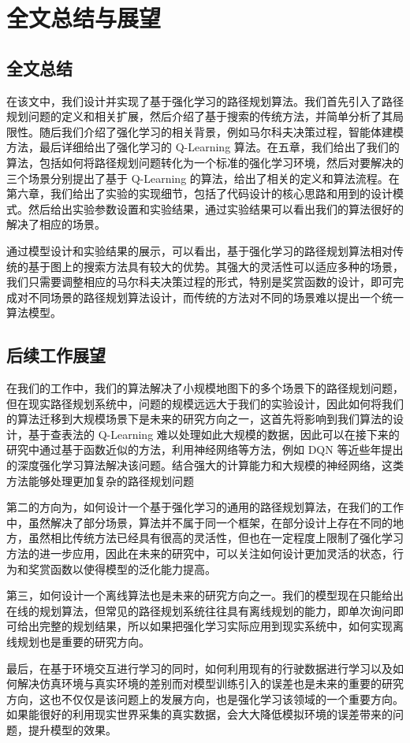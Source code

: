 \documentclass{standalone}
\begin{document}
\chapter{全文总结与展望}
\section{全文总结}
在该文中，我们设计并实现了基于强化学习的路径规划算法。我们首先引入了路径规划问题的定义和相关扩展，然后介绍了基于搜索的传统方法，并简单分析了其局限性。随后我们介绍了强化学习的相关背景，例如马尔科夫决策过程，智能体建模方法，最后详细给出了强化学习的 Q-Learning 算法。在五章，我们给出了我们的算法，包括如何将路径规划问题转化为一个标准的强化学习环境，然后对要解决的三个场景分别提出了基于 Q-Learning 的算法，给出了相关的定义和算法流程。在第六章，我们给出了实验的实现细节，包括了代码设计的核心思路和用到的设计模式。然后给出实验参数设置和实验结果，通过实验结果可以看出我们的算法很好的解决了相应的场景。\par
通过模型设计和实验结果的展示，可以看出，基于强化学习的路径规划算法相对传统的基于图上的搜索方法具有较大的优势。其强大的灵活性可以适应多种的场景，我们只需要调整相应的马尔科夫决策过程的形式，特别是奖赏函数的设计，即可完成对不同场景的路径规划算法设计，而传统的方法对不同的场景难以提出一个统一算法模型。
\section{后续工作展望}
在我们的工作中，我们的算法解决了小规模地图下的多个场景下的路径规划问题，但在现实路径规划系统中，问题的规模远远大于我们的实验设计，因此如何将我们的算法迁移到大规模场景下是未来的研究方向之一，这首先将影响到我们算法的设计，基于查表法的 Q-Learning 难以处理如此大规模的数据，因此可以在接下来的研究中通过基于函数近似的方法，利用神经网络等方法，例如 DQN 等近些年提出的深度强化学习算法解决该问题。结合强大的计算能力和大规模的神经网络，这类方法能够处理更加复杂的路径规划问题\par
第二的方向为，如何设计一个基于强化学习的通用的路径规划算法，在我们的工作中，虽然解决了部分场景，算法并不属于同一个框架，在部分设计上存在不同的地方，虽然相比传统方法已经具有很高的灵活性，但也在一定程度上限制了强化学习方法的进一步应用，因此在未来的研究中，可以关注如何设计更加灵活的状态，行为和奖赏函数以使得模型的泛化能力提高。\par
第三，如何设计一个离线算法也是未来的研究方向之一。我们的模型现在只能给出在线的规划算法，但常见的路径规划系统往往具有离线规划的能力，即单次询问即可给出完整的规划结果，所以如果把强化学习实际应用到现实系统中，如何实现离线规划也是重要的研究方向。\par
最后，在基于环境交互进行学习的同时，如何利用现有的行驶数据进行学习以及如何解决仿真环境与真实环境的差别而对模型训练引入的误差也是未来的重要的研究方向，这也不仅仅是该问题上的发展方向，也是强化学习该领域的一个重要方向。如果能很好的利用现实世界采集的真实数据，会大大降低模拟环境的误差带来的问题，提升模型的效果。
\end{document}
